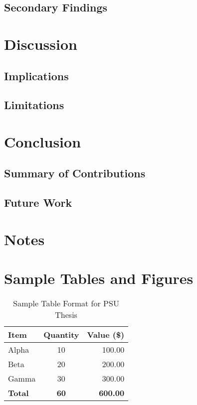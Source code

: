 \documentclass{psu-thesis}
\begin{document}
\section{Secondary Findings}
\lipsum[19]

\chapter{Discussion}

\lipsum[20-22]

\section{Implications}
\lipsum[23]

\section{Limitations}
\lipsum[24]

\chapter{Conclusion}

\lipsum[25-27]

\section{Summary of Contributions}
\lipsum[28]

\section{Future Work}
\lipsum[29]

\printchicagobibliography

\chapter*{Notes}
\printchicagonotes

\appendix

\chapter{Sample Tables and Figures}

\lipsum[30]

\begin{table}[htbp]
\caption{Sample Table Format for PSU Thesis}
\centering
\begin{tabular}{|l|c|r|}
\hline
\textbf{Item} & \textbf{Quantity} & \textbf{Value (\$)} \\
\hline
Alpha & 10 & 100.00 \\
Beta & 20 & 200.00 \\
Gamma & 30 & 300.00 \\
\hline
\textbf{Total} & \textbf{60} & \textbf{600.00} \\
\hline
\end{tabular}
\end{table}
\end{document}
